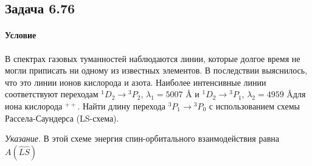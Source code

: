 \documentclass[12pt]{article}
\begin{document}
\subsection{Задача 6.76}
\label{task_6.76}
\paragraph{Условие}
В спектрах газовых туманностей наблюдаются линии, которые долгое время не могли приписать ни одному из известных элементов. В последствии выяснилось, что это линии ионов кислорода и азота. Наиболее интенсивные линии соответствуют переходам ${}^1D_2 \rightarrow {}^3P_2$, $\lambda_1 = 5007$ \AA\text{ } и ${}^1D_2 \rightarrow {}^3P_1$, $\lambda_2 = 4959$ \AA\text{ }для иона кислорода ${}^{++}$. Найти длину перехода ${}^3P_1 \rightarrow {}^3P_0$ с использованием схемы Рассела-Саундерса (LS-схема).

\vspace{1em} \noindent
\textit{Указание}. В этой схеме энергия спин-орбитального взаимодействия равна $A( \hat{L}\hat{S} )$
\end{document}
